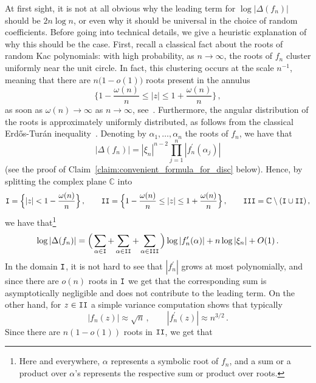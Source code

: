 \documentclass[11pt]{amsart}
\theoremstyle{remark}
\theoremstyle{definition}
\newcommand{\bC}{\mathbb C}
\begin{document}
        At first sight, it is not at all obvious why the leading term for $\log|\Delta(f_n)|$ should be $2n\log n$, or even why it should be universal in the choice of random coefficients. Before going into technical details, we give a heuristic explanation of why this should be the case. First, recall a classical fact about the roots of random Kac polynomials: with high probability, as $n\to\infty$, the roots of $f_n$ cluster uniformly near the unit circle. In fact, this clustering occurs at the scale $n^{-1}$, meaning that there are $n\big(1-o(1)\big)$ roots present in the annulus 
        \[
        \Big\{ 1- \frac{\omega(n)}{n} \le |z| \le 1 + \frac{\omega(n)}{n} \Big\} \, ,
        \]
        as soon as $\omega(n)\to \infty$ as $n\to \infty$, see~\cite{Ibragimov-Zeitouni, Shepp-Vanderbei}. Furthermore, the angular distribution of the roots is approximately uniformly distributed, as follows from the classical Erd\H os-Tur\'an inequality~\cite{Erdos-Turan-AOM}. Denoting by $\alpha_1,\ldots,\alpha_n$ the roots of $f_n$, we have that 
        \[
        |\Delta(f_n)| = |\xi_n|^{n-2} \prod_{j=1}^{n} |f_n^\prime(\alpha_j)|
        \]
        (see the proof of Claim~\ref{claim:convenient_formula_for_disc} below). Hence, by splitting the complex plane $\bC$ into 
        \[
        {\tt I}  = \Big\{|z| < 1 - \frac{\omega(n)}{n} \Big\} \, , \qquad {\tt II} = \Big\{ 1- \frac{\omega(n)}{n} \le |z| \le 1 + \frac{\omega(n)}{n} \Big\} \, , \qquad {\tt III} = \bC\setminus({\tt I}\cup {\tt II}) \, , 
        \]
        we have that\footnote{Here and everywhere, $\alpha$ represents a symbolic root of $f_n$, and a sum or a product over $\alpha$'s represents the respective sum or product over roots.} 
        \begin{equation}
        \label{eq:intro_heuristic_for_leaing_term_in_discriminant_breakup_into_domains}
            \log|\Delta(f_n)| = \Big(\sum_{\alpha\in {\tt I}} + \sum_{\alpha\in {\tt II}} + \sum_{\alpha\in {\tt III} }\Big) \log|f_n^\prime(\alpha)| + n \log |\xi_n| + O(1) \, . 
        \end{equation}
        In the domain ${\tt I}$, it is not hard to see that $|f_n^\prime|$ grows at most polynomially, and since there are $o(n)$ roots in ${\tt I}$ we get that the corresponding sum is asymptotically negligible and does not contribute to the leading term. On the other hand, for $z\in {\tt II}$ a simple variance computation shows that typically 
        \[
        |f_n(z)| \approx \sqrt{n} \, , \qquad |f_n^\prime(z)| \approx n^{3/2} \, . 
        \]
        Since there are $n(1-o(1))$ roots in ${\tt II}$, we get that
\end{document}
